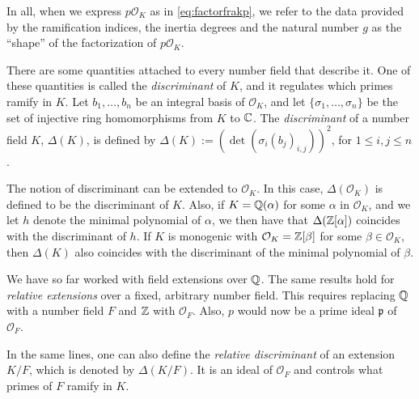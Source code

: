 \documentclass[../main.tex]{subfiles}
\begin{document}
In all, when we express $p\mathcal{O}_K$ as in \cref{eq:factorfrakp}, we refer to the data provided by the ramification indices, the inertia degrees and the natural number $g$ as the ``shape'' of the factorization of $p\mathcal{O}_K$.

There are some quantities attached to every number field that describe it. One of these quantities is called the \emph{discriminant} of $K$, and it regulates which primes ramify in $K$. Let $b_1,\dots,b_n$ be an integral basis of $\mathcal{O}_K$, and let $\{\sigma_1,\dots,\sigma_n\}$ be the set of injective ring homomorphisms from $K$ to $\mathbb{C}$. The \emph{discriminant} of a number field $K$, $\Delta(K)$, is defined by $\Delta(K):=(\det(\sigma_i(b_j)_{i,j}))^2$, for $1\leqslant i,j \leqslant n$.

The notion of discriminant can be extended to $\mathcal{O}_K$. In this case, $\Delta(\mathcal{O}_K)$ is defined to be the discriminant of $K$. Also, if $K=\mathbb{Q}(\alpha)$ for some $\alpha$ in $\mathcal{O}_K$, and we let $h$ denote the minimal polynomial of $\alpha$, we then have that $\Delta(\mathbb{Z}[\alpha])$ coincides with the discriminant of $h$. If $K$ is monogenic with $\mathcal{O}_K=\mathbb{Z}[\beta]$ for some $\beta\in\mathcal{O}_K$, then $\Delta(K)$ also coincides with the discriminant of the minimal polynomial of $\beta$.

\begin{remarknonumber}
We have so far worked with field extensions over $\mathbb{Q}$. The same results hold for \emph{relative extensions} over a fixed, arbitrary number field. This requires replacing $\mathbb{Q}$ with a number field $F$ and $\mathbb{Z}$ with $\mathcal{O}_F$. Also, $p$ would now be a prime ideal $\mathfrak{p}$ of $\mathcal{O}_F$.

In the same lines, one can also define the \emph{relative discriminant} of an extension $K/F$, which is denoted by $\Delta(K/F)$. It is an ideal of $\mathcal{O}_F$ and controls what primes of $F$ ramify in $K$.
\end{remarknonumber}
	
\end{document}
